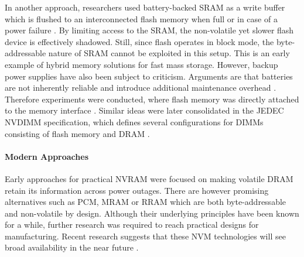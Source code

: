 In another approach, researchers used battery-backed SRAM as a write buffer
which is flushed to an interconnected flash memory when full or in case of a
power failure \cite{wu1994envy}. By limiting access to the SRAM, the
non-volatile yet slower flash device is effectively shadowed. Still, since flash
operates in block mode, the byte-addressable nature of SRAM cannot be exploited
in this setup. This is an early example of hybrid memory solutions for fast mass
storage. However, backup power supplies have also been subject to criticism.
Arguments are that batteries are not inherently reliable and introduce
additional maintenance overhead \cite{molina1992main}. Therefore experiments
were conducted, where flash memory was directly attached to the memory interface
\cite{shi2010write}. Similar ideas were later consolidated in the JEDEC NVDIMM
specification, which defines several configurations for DIMMs consisting of
flash memory and DRAM \cite{oe2016feasibility, huang2014design}.


\paragraph{Modern Approaches} %

Early approaches for practical NVRAM were focused on making volatile DRAM retain its information across power outages. There are however promising alternatives such as PCM, MRAM or RRAM which are both byte-addressable and non-volatile by design. Although their underlying principles have been known for a while, further research was required to reach practical designs for manufacturing. Recent research suggests that these NVM technologies will see broad availability in the near future .


